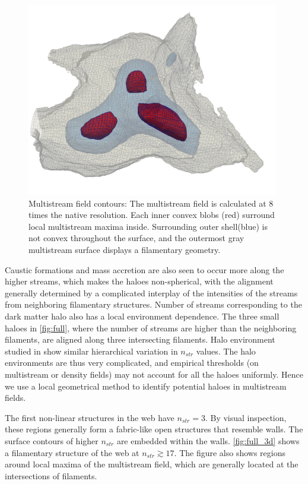 \begin{figure} 
\centering\includegraphics[width=11cm]{Chapter5/Source_v2/fig2.pdf} 
\caption{Multistream field contours: The multistream field is calculated at 8 times the native resolution. Each inner convex blobs (red) surround local multistream maxima inside. Surrounding outer shell(blue) is not convex throughout the surface, and the outermost gray multistream surface displays a filamentary geometry.}
\label{fig:full}
\end{figure}


Caustic formations and mass accretion are also seen to occur more along the higher streams, which makes the haloes non-spherical, with the alignment generally determined by a complicated interplay  of the intensities of the streams from neighboring filamentary structures. Number of streams corresponding to the dark matter halo also has a local environment dependence. The three small haloes in \autoref{fig:full}, where the number of streams are higher than the neighboring filaments, are aligned along three intersecting filaments. Halo environment studied in \cite{Ramachandra2015} show similar hierarchical variation in $n_{str}$ values. The halo environments are thus very complicated, and empirical thresholds (on multistream or density fields) may not account for all the haloes uniformly. Hence we use a local geometrical method to identify potential haloes in multistream fields.


The first non-linear structures in the web have $n_{str} = 3$. By visual inspection, these regions generally form a fabric-like open structures that resemble walls. The surface contours of higher $n_{str}$ are embedded within the walls. \autoref{fig:full_3d} shows a filamentary structure of the web at $n_{str} \gtrsim 17$. The figure also shows regions around local maxima of the multistream field, which are generally located at the intersections of filaments.    








